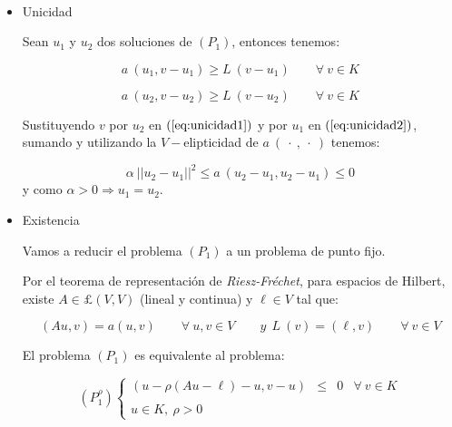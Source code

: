 \begin{demosteorema}
\ \newline
\begin{itemize}
\item Unicidad\newline

Sean $u_1$ y $u_2$ dos soluciones de $(P_1)$, entonces tenemos:

\begin{equation} \label{eq:unicidad1}
a\ (u_1,v-u_1) \ge L\ (v-u_1) \qquad \forall \ v \in K
\end{equation}

\begin{equation} \label{eq:unicidad2}
a\ (u_2,v-u_2) \ge L\ (v-u_2) \qquad \forall \ v \in K
\end{equation}

Sustituyendo $v$ por $u_2$ en $(\ref{eq:unicidad1})$ y por $u_1$ en 
$(\ref{eq:unicidad2})$, sumando y utilizando la $V-$elipticidad de
$a\ (\ \cdot \ , \ \cdot \ )$ tenemos:

\begin{displaymath}
\alpha \ ||u_2 -u_1 ||^2 \le a\ (u_2 - u_1, u_2 - u_1) \le 0
\end{displaymath}
y como $\alpha > 0 \Longrightarrow u_1 = u_2$.

\item Existencia\newline

Vamos a reducir el problema $(P_1)$ a un problema de punto fijo.\newline

Por el teorema de representaci\'on de \emph{Riesz-Fr\'echet}, para espacios
de Hilbert, existe $A \in \pounds(V,V)$ (lineal y continua) y $\ell \in V$
tal que:

\begin{displaymath}
(Au,v) = a(u,v) \qquad \forall \ u,v \in V \qquad y \ \ L\ (v) = (\ell ,v)
\qquad \forall \ v \in V
\end{displaymath}

El problema $(P_1)$ es equivalente al problema:

\begin{equation} \label{eq:p1ro}
(P_1^{\rho}) \left\{ \begin{array}{lrlr}
(u-\rho (Au-\ell )-u, v-u) & \le & 0 & \forall \ v \in K \\
\\
u \in K,\ \rho > 0
\end{array} \right.
\end{equation}


\end{itemize}
\end{demosteorema}
